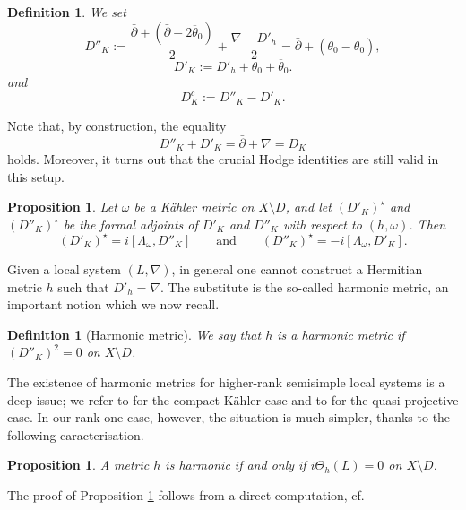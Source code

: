 \documentclass[english]{amsart}
\newcommand{\ol}{\overline}
\newcommand{\dbar}{\bar \partial}
\newtheorem{proposition}[thm]{Proposition}
\newtheorem{defn}[thm]{Definition}
\numberwithin{equation}{thm}
\begin{document}
\begin{defn}\label{def:connection}
	We set
	\begin{equation}\label{dbarop}
		D''_K
		:= \frac{\dbar+(\dbar-2\ol\theta_0)}{2}+\frac{\nabla-D'_h}{2}
		= \dbar + (\theta_0-\ol\theta_0),
	\end{equation}
	\begin{equation}\label{e1}
		D'_K := D'_h+\theta_0+\ol\theta_0.
	\end{equation}
	and 
		\begin{equation}
		D^c _K := D''_K -D'_K.
	\end{equation}
\end{defn}

Note that, by construction, the equality
\[
D''_K + D'_K = \dbar+\nabla = D_K
\]
holds. Moreover, it turns out that 
the crucial Hodge identities are still valid in this setup.

\begin{proposition}
	Let $\omega$ be a K\"ahler metric on $X\setminus D$, and let $(D'_K)^\star$ and $(D''_K)^\star$ be the formal adjoints of $D'_K$ and $D''_K$ with respect to $(h,\omega)$.
	Then
	\begin{equation}\label{kahleridentity}
		(D'_K)^\star = i[\Lambda_\omega,D''_K]
		\qquad\text{and}\qquad
		(D''_K)^\star = -i[\Lambda_\omega,D'_K].
	\end{equation}
\end{proposition}

Given a local system $(L,\nabla)$, in general one cannot construct a Hermitian metric $h$ such that $D'_h=\nabla$. The substitute is the so-called harmonic metric, an important notion which we now recall.

\begin{defn}[Harmonic metric]\label{def:harmonic}
	We say that $h$ is a \emph{harmonic metric} if $(D''_K)^2=0$ on $X\setminus D$.
\end{defn}

The existence of harmonic metrics for higher-rank semisimple local systems is a deep issue; we refer to \cite{Sim92} for the compact K\"ahler case and to \cite{Moc06} for the quasi-projective case.
In our rank-one case, however, the situation is much simpler, thanks to the following caracterisation.

\begin{proposition}\label{harmonicmetric}
	A metric $h$ is harmonic if and only if $i\Theta_h(L)=0$ on $X\setminus D$.
\end{proposition}
The proof of Proposition \ref{harmonicmetric} follows from a direct computation, cf. \cite[Prop 6.6]{CDHP}
\end{document}
